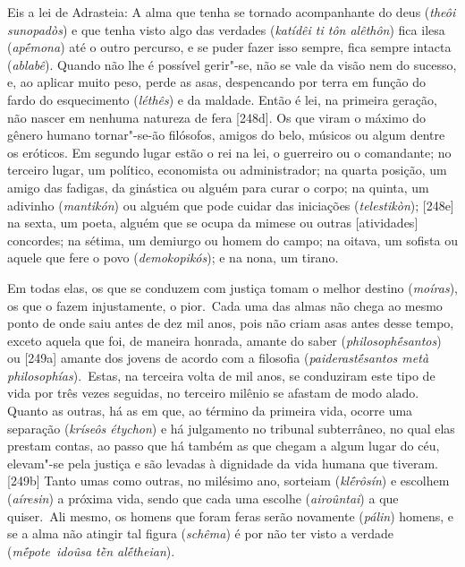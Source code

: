 Eis a lei de Adrasteia: A alma que tenha se tornado acompanhante do deus
(\emph{theôi sunopadòs}) e que tenha visto algo das verdades
(\emph{katídêi ti tôn alêthôn}) fica ilesa (\emph{apḗmona}) até o outro
percurso, e se puder fazer isso sempre, fica sempre intacta
(\emph{ablabê}). Quando não lhe é possível gerir"-se, não se vale da
visão nem do sucesso, e, ao aplicar muito peso, perde as asas,
despencando por terra em função do fardo do esquecimento (\emph{léthês})
e da maldade. Então é lei, na primeira geração, não nascer em nenhuma
natureza de fera [248d]. Os que viram o máximo do gênero humano
tornar"-se-ão filósofos, amigos do belo, músicos ou algum dentre os
eróticos. Em segundo lugar estão o rei na lei, o guerreiro ou o
comandante; no terceiro lugar, um político, economista ou administrador;
na quarta posição, um amigo das fadigas, da ginástica ou alguém para
curar o corpo; na quinta, um adivinho (\emph{mantikón}) ou alguém que
pode cuidar das iniciações (\emph{telestikòn}); [248e] na sexta, um
poeta, alguém que se ocupa da mimese ou outras [atividades]
concordes; na sétima, um demiurgo ou homem do campo; na oitava, um sofista
ou aquele que fere o povo (\emph{demokopikós}); e na nona, um tirano.

Em todas elas, os que se conduzem com justiça tomam o melhor destino
(\emph{moíras}), os que o fazem injustamente, o pior.~Cada uma das almas
não chega ao mesmo ponto de onde saiu antes de dez mil anos, pois não
criam asas antes desse tempo, exceto aquela que foi, de maneira honrada,
amante do saber (\emph{philosophḗsantos}) ou [249a] amante dos
jovens de acordo com a filosofia (\emph{paiderastḗsantos metà
philosophías}).\emph{~}Estas, na terceira volta de mil anos, se
conduziram este tipo de vida por três vezes seguidas, no terceiro
milênio se afastam de modo alado. Quanto as outras, há as em que, ao término
da primeira vida, ocorre uma separação (\emph{kríseôs étychon}) e há
julgamento no tribunal subterrâneo, no qual elas prestam contas, ao
passo que há também as que chegam a algum lugar do céu, elevam"-se pela
justiça e são levadas à dignidade da vida humana que tiveram. [249b]
Tanto umas como outras, no milésimo ano, sorteiam (\emph{klḗrôsín}) e
escolhem (\emph{aíresin}) a próxima vida, sendo que cada uma escolhe
(\emph{airoûntai}) a que quiser.~Ali mesmo, os homens que foram feras
serão novamente (\emph{pálin}) homens, e se a alma não atingir tal
figura (\emph{schêma}) é por não ter visto a verdade
(\emph{mḗpote}~\emph{idoûsa tḕn alḗtheian}).

